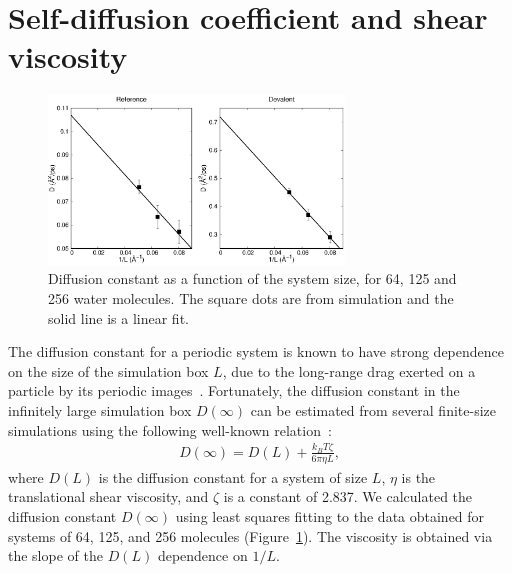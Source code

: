 \documentclass[journal=jacsat,manuscript=article]{achemso}
\newcommand{\bea}{\begin{eqnarray}}
\newcommand{\eea}{\end{eqnarray}}
\begin{document}

\section{Self-diffusion coefficient and shear viscosity} 

\begin{figure}[t]
\includegraphics[width=0.7\textwidth]{msd}
\caption{Diffusion constant as a function of the system size, for 64, 125 and 256 water molecules. 
The square dots are from simulation and the solid line is a linear fit.}\label{Fig:dfs}
\end{figure} 

The diffusion constant for a periodic system is known to have strong dependence on the size of the simulation box $L$, due to the long-range drag exerted on a particle by its periodic images~\cite{dunweg1993molecular}. 
Fortunately, the diffusion constant in the infinitely large simulation box $D(\infty)$ can be estimated from several finite-size simulations using the following well-known relation~\cite{dunweg1993molecular}:
%
\bea
D(\infty) = D(L) + \frac{k_BT\zeta}{6\pi \eta L},
\eea
%
where $D(L)$ is the diffusion constant for a system of size $L$, $\eta$ is the translational shear viscosity, and $\zeta$ is a constant of 2.837. 
We calculated the diffusion constant $D(\infty)$ using least squares fitting to the data obtained for systems of 64, 125, and 256 molecules (Figure~\ref{Fig:dfs}). The viscosity is obtained via the slope of the $D(L)$ dependence on $1/L$.
\end{document}
